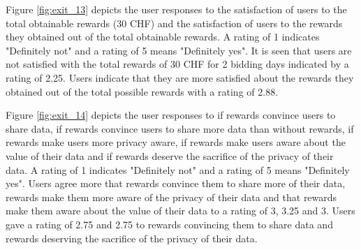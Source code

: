 Figure \ref{fig:exit_13} depicts the user responses to the satisfaction of users to the total obtainable rewards (30 CHF) and the satisfaction of users to the rewards they obtained out of the total obtainable rewards. A rating of 1 indicates "Definitely not" and a rating of 5 means "Definitely yes". It is seen that users are not satisfied with the total rewards of 30 CHF for 2 bidding days indicated by a rating of 2.25. Users indicate that they are more satisfied about the rewards they obtained out of the total possible rewards with a rating of 2.88. 

Figure \ref{fig:exit_14} depicts the user responses to if rewards convince users to share data, if rewards convince users to share more data than without rewards, if rewards make users more privacy aware, if rewards make users aware about the value of their data and if rewards deserve the sacrifice of the privacy of their data.  A rating of 1 indicates "Definitely not" and a rating of 5 means "Definitely yes". Users agree more that rewards convince them to share more of their data, rewards make them more aware of the privacy of their data and that rewards make them aware about the value of their data to a rating of 3, 3.25 and 3. Users gave a rating of 2.75 and 2.75 to rewards convincing them to share data and rewards deserving the sacrifice of the privacy of their data. 

